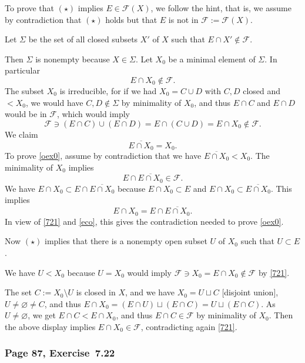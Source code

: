 \documentclass[12pt,letterpaper]{article}%
\begin{document}
To prove that $(\star)$ implies $E\in\mathcal F(X)$, we follow the hint, that is, we assume by contradiction that $(\star)$ holds but that $E$ is not in $\mathcal F:=\mathcal F(X)$.

Let $\Sigma$ be the set of all closed subsets $X'$ of $X$ such that $E\cap X'\notin\mathcal F$. 

Then $\Sigma$ is nonempty because $X\in\Sigma$. Let $X_0$ be a minimal element of $\Sigma$. In particular 
\begin{equation}\label{721}
E\cap X_0\notin\mathcal F.
\end{equation}  
The subset $X_0$ is irreducible, for if we had $X_0=C\cup D$ with $C,D$ closed and $<X_0$, we would have $C,D\notin\Sigma$ by minimality of $X_0$, and thus $E\cap C$ and $E\cap D$ would be in $\mathcal F$, which would imply 
$$
\mathcal F\ni(E\cap C)\cup(E\cap D)=E\cap(C\cup D)=E\cap X_0\notin\mathcal F.
$$ 
We claim 
\begin{equation}\label{oex0}
\overline{E\cap X_0}=X_0.
\end{equation}
To prove \eqref{oex0}, assume by contradiction that we have $\overline{E\cap X_0}<X_0$. The minimality of $X_0$ implies 
\begin{equation}\label{eco}
E\cap\overline{E\cap X_0}\in\mathcal F.
\end{equation}
We have $E\cap X_0\subset E\cap\overline{E\cap X_0}$ because $E\cap X_0\subset E$ and $E\cap X_0\subset\overline{E\cap X_0}$. This implies 
$$
E\cap X_0=E\cap\overline{E\cap X_0}.
$$ 
In view of \eqref{721} and \eqref{eco}, this gives the contradiction needed to prove \eqref{oex0}.

Now $(\star)$ implies that there is a nonempty open subset $U$ of $X_0$ such that $U\subset E$. 

We have $U<X_0$ because $U=X_0$ would imply $\mathcal F\ni X_0=E\cap X_0\notin\mathcal F$ by \eqref{721}. 

The set $C:=X_0\setminus U$ is closed in $X$, and we have $X_0=U\sqcup C$ [disjoint union], $U\ne\varnothing\ne C$, and thus $E\cap X_0=(E\cap U)\sqcup(E\cap C)=U\sqcup(E\cap C)$. As $U\ne\varnothing$, we get $E\cap C<E\cap X_0$, and thus $E\cap C\in\mathcal F$ by minimality of $X_0$. Then the above display implies $E\cap X_0\in\mathcal F$, contradicting again \eqref{721}.

\subsubsection{Page 87, Exercise~7.22}\label{ex7.22}%
\end{document}
